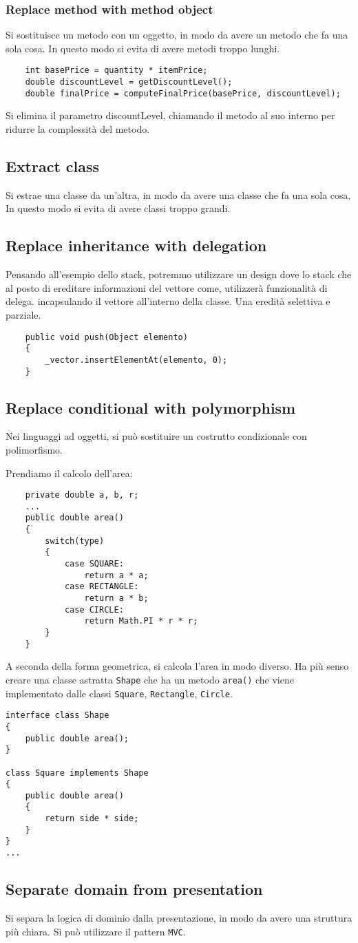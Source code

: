 \subsubsection{Replace method with method object}
Si sostituisce un metodo con un oggetto, in modo da avere un metodo
che fa una sola cosa. In questo modo si evita di avere metodi troppo lunghi.
\begin{lstlisting}
    int basePrice = quantity * itemPrice;
    double discountLevel = getDiscountLevel();
    double finalPrice = computeFinalPrice(basePrice, discountLevel);
\end{lstlisting}
Si elimina il parametro discountLevel, chiamando il metodo al suo interno 
per ridurre la complessità del metodo.
\subsection{Extract class}
Si estrae una classe da un'altra, in modo da avere una classe che
fa una sola cosa. In questo modo si evita di avere classi troppo grandi.
\subsection{Replace inheritance with delegation}
Pensando all'esempio dello stack, potremmo utilizzare un design dove lo stack 
che al posto di ereditare informazioni del vettore come, utilizzerà funzionalità 
di delega. incapsulando il vettore all'interno della classe. Una eredità 
selettiva e parziale.
\begin{lstlisting}
    public void push(Object elemento)
    {
        _vector.insertElementAt(elemento, 0);
    }
\end{lstlisting}
\subsection{Replace conditional with polymorphism}
Nei linguaggi ad oggetti, si può sostituire un costrutto condizionale con
polimorfismo.

Prendiamo il calcolo dell'area:
\begin{lstlisting}
    private double a, b, r;
    ...
    public double area()
    {
        switch(type)
        {
            case SQUARE:
                return a * a;
            case RECTANGLE:
                return a * b;
            case CIRCLE:
                return Math.PI * r * r;
        }
    }
\end{lstlisting}
A seconda della forma geometrica, si calcola l'area
in modo diverso.
Ha più senso creare una classe astratta \texttt{Shape} che
ha un metodo \texttt{area()} che viene implementato dalle classi
\texttt{Square}, \texttt{Rectangle}, \texttt{Circle}.
\begin{lstlisting}
interface class Shape
{
    public double area();
}

class Square implements Shape
{
    public double area()
    {
        return side * side;
    }
}
...
\end{lstlisting}
\subsection{Separate domain from presentation}
Si separa la logica di dominio dalla presentazione, in modo da
avere una struttura più chiara. Si può utilizzare il pattern \texttt{MVC}.